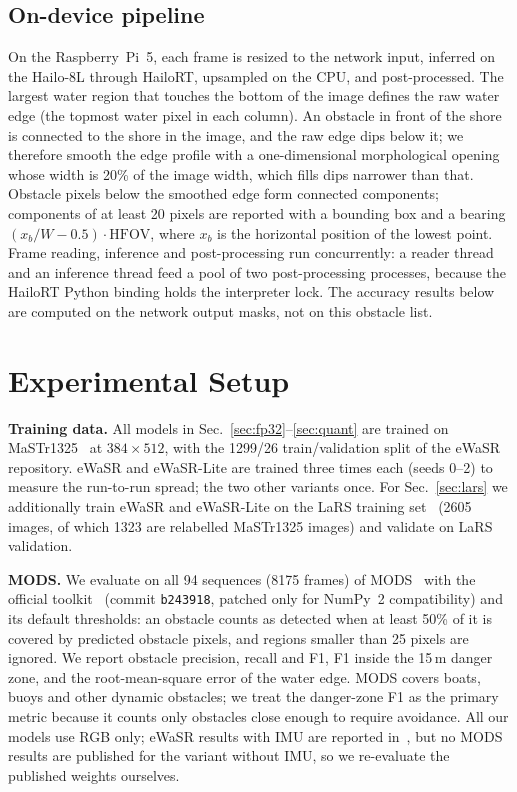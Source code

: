 \documentclass[conference]{IEEEtran}
\begin{document}
\subsection{On-device pipeline}
On the Raspberry~Pi~5, each frame is resized to the network input, inferred on the Hailo-8L through HailoRT, upsampled on the CPU, and post-processed. The largest water region that touches the bottom of the image defines the raw water edge (the topmost water pixel in each column). An obstacle in front of the shore is connected to the shore in the image, and the raw edge dips below it; we therefore smooth the edge profile with a one-dimensional morphological opening whose width is 20\% of the image width, which fills dips narrower than that. Obstacle pixels below the smoothed edge form connected components; components of at least 20 pixels are reported with a bounding box and a bearing $(x_b/W-0.5)\cdot\mathrm{HFOV}$, where $x_b$ is the horizontal position of the lowest point. Frame reading, inference and post-processing run concurrently: a reader thread and an inference thread feed a pool of two post-processing processes, because the HailoRT Python binding holds the interpreter lock. The accuracy results below are computed on the network output masks, not on this obstacle list.

\section{Experimental Setup}
\label{sec:setup}
\textbf{Training data.} All models in Sec.~\ref{sec:fp32}--\ref{sec:quant} are trained on MaSTr1325~\cite{bovcon2019mastr} at $384\times512$, with the 1299/26 train/validation split of the eWaSR repository. eWaSR and eWaSR-Lite are trained three times each (seeds 0--2) to measure the run-to-run spread; the two other variants once. For Sec.~\ref{sec:lars} we additionally train eWaSR and eWaSR-Lite on the LaRS training set~\cite{zust2023lars} (2605 images, of which 1323 are relabelled MaSTr1325 images) and validate on LaRS validation.

\textbf{MODS.} We evaluate on all 94 sequences (8175 frames) of MODS~\cite{bovcon2022mods} with the official toolkit~\cite{mods_toolkit} (commit \texttt{b243918}, patched only for NumPy~2 compatibility) and its default thresholds: an obstacle counts as detected when at least 50\% of it is covered by predicted obstacle pixels, and regions smaller than 25 pixels are ignored. We report obstacle precision, recall and F1, F1 inside the 15\,m danger zone, and the root-mean-square error of the water edge. MODS covers boats, buoys and other dynamic obstacles; we treat the danger-zone F1 as the primary metric because it counts only obstacles close enough to require avoidance. All our models use RGB only; eWaSR results with IMU are reported in~\cite{tersek2023ewasr}, but no MODS results are published for the variant without IMU, so we re-evaluate the published weights ourselves.
\end{document}
